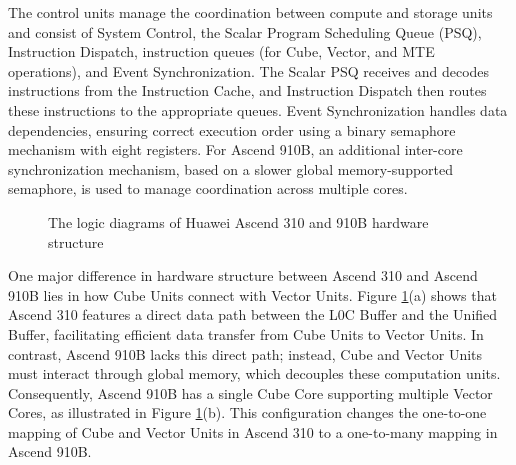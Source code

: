 The control units manage the coordination between compute and storage units and consist of System Control, the Scalar Program Scheduling Queue (PSQ), Instruction Dispatch, instruction queues (for Cube, Vector, and MTE operations), and Event Synchronization. The Scalar PSQ receives and decodes instructions from the Instruction Cache, and Instruction Dispatch then routes these instructions to the appropriate queues. Event Synchronization handles data dependencies, ensuring correct execution order using a binary semaphore mechanism with eight registers. For Ascend 910B, an additional inter-core synchronization mechanism, based on a slower global memory-supported semaphore, is used to manage coordination across multiple cores.

\begin{figure}[tb]
    \caption{The logic diagrams of Huawei Ascend 310 and 910B hardware structure}
    \label{fig:dav}
    \end{figure}

One major difference in hardware structure between Ascend 310 and Ascend 910B lies in how Cube Units connect with Vector Units. Figure \ref{fig:dav}(a) shows that Ascend 310 features a direct data path between the L0C Buffer and the Unified Buffer, facilitating efficient data transfer from Cube Units to Vector Units. In contrast, Ascend 910B lacks this direct path; instead, Cube and Vector Units must interact through global memory, which decouples these computation units. Consequently, Ascend 910B has a single Cube Core supporting multiple Vector Cores, as illustrated in Figure \ref{fig:dav}(b). This configuration changes the one-to-one mapping of Cube and Vector Units in Ascend 310 to a one-to-many mapping in Ascend 910B.

